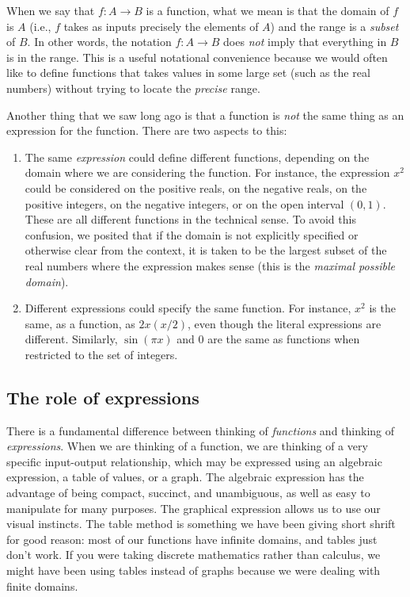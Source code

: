\documentclass[10pt]{amsart}
\begin{document}
When we say that $f:A \to B$ is a function, what we mean is that the
domain of $f$ is $A$ (i.e., $f$ takes as inputs precisely the elements
of $A$) and the range is a {\em subset} of $B$. In other words, the
notation $f: A \to B$ does {\em not} imply that everything in $B$ is
in the range. This is a useful notational convenience because we would
often like to define functions that takes values in some large set
(such as the real numbers) without trying to locate the {\em precise}
range.

Another thing that we saw long ago is that a function is {\em not} the
same thing as an expression for the function. There are two aspects to
this:

\begin{enumerate}
\item The same {\em expression} could define different functions,
  depending on the domain where we are considering the function. For
  instance, the expression $x^2$ could be considered on the positive
  reals, on the negative reals, on the positive integers, on the
  negative integers, or on the open interval $(0,1)$. These are all
  different functions in the technical sense. To avoid this confusion,
  we posited that if the domain is not explicitly specified or
  otherwise clear from the context, it is taken to be the largest
  subset of the real numbers where the expression makes sense (this is
  the {\em maximal possible domain}).
\item Different expressions could specify the same function. For
  instance, $x^2$ is the same, as a function, as $2x(x/2)$, even
  though the literal expressions are different. Similarly, $\sin(\pi
  x)$ and $0$ are the same as functions when restricted to the set of
  integers.
\end{enumerate}

\subsection{The role of expressions}

There is a fundamental difference between thinking of {\em functions}
and thinking of {\em expressions}. When we are thinking of a function,
we are thinking of a very specific input-output relationship, which
may be expressed using an algebraic expression, a table of values, or
a graph. The algebraic expression has the advantage of being compact,
succinct, and unambiguous, as well as easy to manipulate for many
purposes. The graphical expression allows us to use our visual
instincts. The table method is something we have been giving short
shrift for good reason: most of our functions have infinite domains,
and tables just don't work. If you were taking discrete mathematics
rather than calculus, we might have been using tables instead of
graphs because we were dealing with finite domains.
\end{document}
